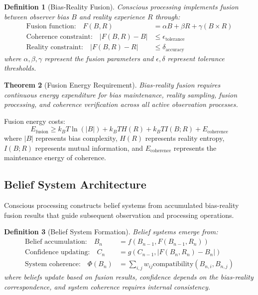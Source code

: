 \documentclass[12pt,a4paper]{article}
\newtheorem{theorem}{Theorem}[section]
\newtheorem{definition}[theorem]{Definition}
\begin{document}
\begin{definition}[Bias-Reality Fusion]
Conscious processing implements fusion between observer bias $B$ and reality experience $R$ through:
\begin{align}
\text{Fusion function:} \quad F(B, R) &= \alpha B + \beta R + \gamma (B \times R) \\
\text{Coherence constraint:} \quad |F(B, R) - B| &\leq \epsilon_{\text{tolerance}} \\
\text{Reality constraint:} \quad |F(B, R) - R| &\leq \delta_{\text{accuracy}}
\end{align}
where $\alpha, \beta, \gamma$ represent the fusion parameters and $\epsilon, \delta$ represent tolerance thresholds.
\end{definition}

\begin{theorem}[Fusion Energy Requirement]
Bias-reality fusion requires continuous energy expenditure for bias maintenance, reality sampling, fusion processing, and coherence verification across all active observation processes.
\end{theorem}

Fusion energy costs:
\begin{equation}
E_{\text{fusion}} \geq k_B T \ln(|B|) + k_B T H(R) + k_B T I(B; R) + E_{\text{coherence}}
\end{equation}
where $|B|$ represents bias complexity, $H(R)$ represents reality entropy, $I(B; R)$ represents mutual information, and $E_{\text{coherence}}$ represents the maintenance energy of coherence.

\subsection{Belief System Architecture}

Conscious processing constructs belief systems from accumulated bias-reality fusion results that guide subsequent observation and processing operations.

\begin{definition}[Belief System Formation]
Belief systems emerge from:
\begin{align}
\text{Belief accumulation:} \quad B_n &= f(B_{n-1}, F(B_{n-1}, R_n)) \\
\text{Confidence updating:} \quad C_n &= g(C_{n-1}, |F(B_n, R_n) - B_n|) \\
\text{System coherence:} \quad \Phi(B_n) &= \sum_{i,j} w_{ij} \text{compatibility}(B_{n,i}, B_{n,j})
\end{align}
where beliefs update based on fusion results, confidence depends on the bias-reality correspondence, and system coherence requires internal consistency.
\end{definition}
\end{document}
